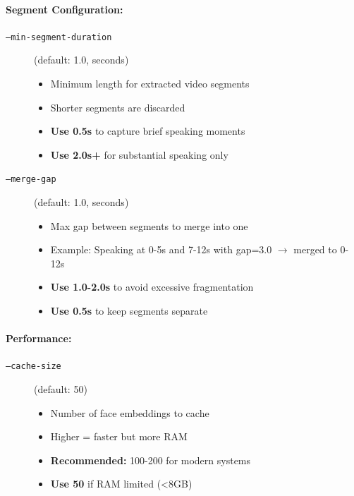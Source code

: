 \documentclass[11pt,a4paper]{article}
\begin{document}
\paragraph{Segment Configuration:}

\begin{description}
    \item[\texttt{--min-segment-duration}] (default: 1.0, seconds)
    \begin{itemize}
        \item Minimum length for extracted video segments
        \item Shorter segments are discarded
        \item \textbf{Use 0.5s} to capture brief speaking moments
        \item \textbf{Use 2.0s+} for substantial speaking only
    \end{itemize}
    
    \item[\texttt{--merge-gap}] (default: 1.0, seconds)
    \begin{itemize}
        \item Max gap between segments to merge into one
        \item Example: Speaking at 0-5s and 7-12s with gap=3.0 $\rightarrow$ merged to 0-12s
        \item \textbf{Use 1.0-2.0s} to avoid excessive fragmentation
        \item \textbf{Use 0.5s} to keep segments separate
    \end{itemize}
\end{description}

\paragraph{Performance:}

\begin{description}
    \item[\texttt{--cache-size}] (default: 50)
    \begin{itemize}
        \item Number of face embeddings to cache
        \item Higher = faster but more RAM
        \item \textbf{Recommended:} 100-200 for modern systems
        \item \textbf{Use 50} if RAM limited (<8GB)
    \end{itemize}
\end{description}
\end{document}
